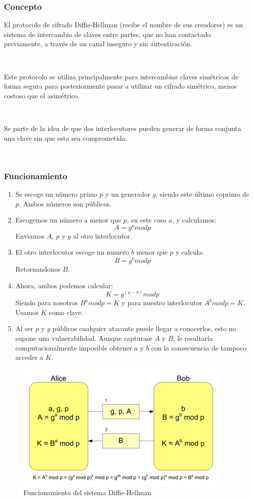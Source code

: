 \documentclass[11pt, conference]{IEEEtran}
\begin{document}
\subsubsection{Concepto}
El protocolo de cifrado Diffie-Hellman (recibe el nombre de sus creadores) es un sistema de intercambio de claves entre partes, que no han contactado previamente, a través de un canal inseguro y sin autenticación.

\

Este protocolo se utiliza principalmente para intercambiar claves simétricas de forma segura para posteriormente pasar a utilizar un cifrado simétrico, menos costoso que el asimétrico.

\

Se parte de la idea de que dos interlocutores pueden generar de forma conjunta una clave sin que esta sea comprometida.

\

\subsubsection{Funcionamiento}
\begin{enumerate}
	\item Se escoge un número primo $p$ y un generador $g$, siendo este último coprimo de $p$. Ambos números son públicos.
	\item Escogemos un número a menor que $p$, en este caso $a$, y calculamos:
	\medskip
	\[
	A = g^a  mod p 
	\]
	\medskip
	Enviamos $A$, $p$ y $g$ al otro interlocutor.
	\item El otro interlocutor escoge un numero $b$ menor que $p$ y calcula:
	\medskip
	\[
	B = g^b mod p
	\]
	\medskip
	Retornandonos $B$.
	\item Ahora, ambos podemos calcular:
	\medskip
	\[
	K = g^(a-b)mod p
	\]
	\medskip
	Siendo para nosotros $B^a mod p = K$ y para nuestro interlocutor $A^b mod p = K$. Usamos $K$ como clave.
	\item Al ser $p$ y $g$ públicos cualquier atacante puede llegar a conocerlos, esto no supone una vulnerabilidad. Aunque capturase $A$ y $B$, le resultaría computacionalmente imposible obtener $a$ y $b$ con la consecuencia de tampoco acceder a $K$. 
\end{enumerate}

\begin{figure}[h]
	\begin{center}
		\includegraphics[scale=0.60]{Diffie.png} \end{center}
	\caption{Funcionamiento del sistema Diffie-Hellman}
\end{figure}
\end{document}
